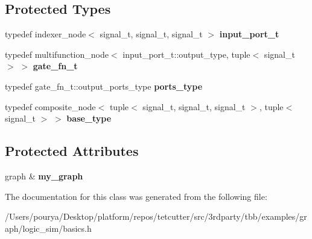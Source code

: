 \subsection*{Protected Types}
\begin{DoxyCompactItemize}
\item 
\hypertarget{classgate_3_013_01_4_a3318be3e09e98626a84b3efad3b04440}{}typedef indexer\+\_\+node$<$ signal\+\_\+t, signal\+\_\+t, signal\+\_\+t $>$ {\bfseries input\+\_\+port\+\_\+t}\label{classgate_3_013_01_4_a3318be3e09e98626a84b3efad3b04440}

\item 
\hypertarget{classgate_3_013_01_4_aa554b7b5577250e408c210a7fed43a21}{}typedef multifunction\+\_\+node$<$ input\+\_\+port\+\_\+t\+::output\+\_\+type, tuple$<$ signal\+\_\+t $>$ $>$ {\bfseries gate\+\_\+fn\+\_\+t}\label{classgate_3_013_01_4_aa554b7b5577250e408c210a7fed43a21}

\item 
\hypertarget{classgate_3_013_01_4_a2069c5b1a9b5dd6235321ecb6ef8e1b5}{}typedef gate\+\_\+fn\+\_\+t\+::output\+\_\+ports\+\_\+type {\bfseries ports\+\_\+type}\label{classgate_3_013_01_4_a2069c5b1a9b5dd6235321ecb6ef8e1b5}

\item 
\hypertarget{classgate_3_013_01_4_aaca1911e1a1084ce7568633a424715d6}{}typedef composite\+\_\+node$<$ tuple$<$ signal\+\_\+t, signal\+\_\+t, signal\+\_\+t $>$, tuple$<$ signal\+\_\+t $>$ $>$ {\bfseries base\+\_\+type}\label{classgate_3_013_01_4_aaca1911e1a1084ce7568633a424715d6}

\end{DoxyCompactItemize}
\subsection*{Protected Attributes}
\begin{DoxyCompactItemize}
\item 
\hypertarget{classgate_3_013_01_4_a6ee666a80df1d524536eb60981d94384}{}graph \& {\bfseries my\+\_\+graph}\label{classgate_3_013_01_4_a6ee666a80df1d524536eb60981d94384}

\end{DoxyCompactItemize}


The documentation for this class was generated from the following file\+:\begin{DoxyCompactItemize}
\item 
/\+Users/pourya/\+Desktop/platform/repos/tetcutter/src/3rdparty/tbb/examples/graph/logic\+\_\+sim/basics.\+h\end{DoxyCompactItemize}
